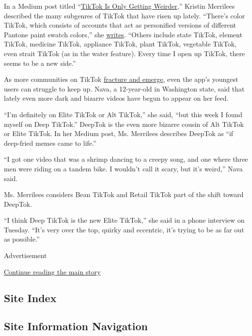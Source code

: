 In a Medium post titled
``\href{https://medium.com/@kristinmerrilees23/tiktok-is-only-getting-weirder-3c51b072f2f9}{TikTok
Is Only Getting Weirder},'' Kristin Merrilees described the many
subgenres of TikTok that have risen up lately. ``There's color TikTok,
which consists of accounts that act as personified versions of different
Pantone paint swatch colors,'' she
\href{https://medium.com/@kristinmerrilees23/tiktok-is-only-getting-weirder-3c51b072f2f9}{writes}.
``Others include state TikTok, element TikTok, medicine TikTok,
appliance TikTok, plant TikTok, vegetable TikTok, even strait TikTok (as
in the water feature). Every time I open up TikTok, there seems to be a
new side.''

As more communities on TikTok
\href{https://twitter.com/hvzitates/status/1270101842207236096}{fracture
and emerge}, even the app's youngest users can struggle to keep up.
Nava, a 12-year-old in Washington state, said that lately even more dark
and bizarre videos have begun to appear on her feed.

``I'm definitely on Elite TikTok or Alt TikTok,'' she said, ``but this
week I found myself on Deep TikTok.'' DeepTok is the even more bizarre
cousin of Alt TikTok or Elite TikTok. In her Medium post, Ms. Merrilees
describes DeepTok as ``if deep-fried memes came to life.''

``I got one video that was a shrimp dancing to a creepy song, and one
where three men were riding on a tandem bike. I wouldn't call it scary,
but it's weird,'' Nava said.

Ms. Merrilees considers Bean TikTok and Retail TikTok part of the shift
toward DeepTok.

``I think Deep TikTok is the new Elite TikTok,'' she said in a phone
interview on Tuesday. ``It's very over the top, quirky and eccentric,
it's trying to be as far out as possible.''

Advertisement

\protect\hyperlink{after-bottom}{Continue reading the main story}

\hypertarget{site-index}{%
\subsection{Site Index}\label{site-index}}

\hypertarget{site-information-navigation}{%
\subsection{Site Information
Navigation}\label{site-information-navigation}}

